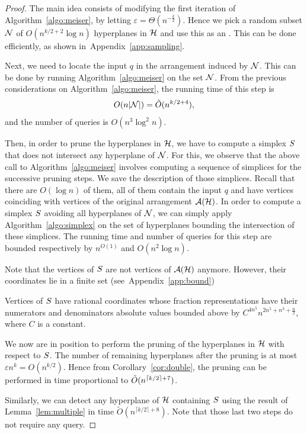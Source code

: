 \begin{proof}
The main idea consists of modifying the first iteration of Algorithm~\ref{algo:meiser}, by
letting $\varepsilon = \Theta(n^{-\frac{k}{2}})$.
Hence we pick a random subset $\mathcal{N}$ of
$O(n^{k/2 + 2} \log n)$ hyperplanes in $\mathcal{H}$ and use this as an \enet.
This can be done efficiently, as shown in~Appendix~\ref{app:sampling}.

Next, we need to locate the input $q$ in the arrangement induced by
$\mathcal{N}$. This can be done by running Algorithm~\ref{algo:meiser} on the set
$\mathcal{N}$. From the previous considerations on Algorithm~\ref{algo:meiser}, the
running time of this step is
$$
O(n|\mathcal{N}|) = \tilde{O}(n^{k/2 + 4}),
$$
and the number of queries is $O(n^3\log^2 n)$.

Then, in order to prune the hyperplanes in $\mathcal{H}$, we have to
compute a simplex $S$ that does not intersect any hyperplane of
$\mathcal{N}$. For this, we observe that the above call to Algorithm~\ref{algo:meiser}
involves computing a sequence of simplices for the successive pruning
steps. We save the description of those simplices. Recall that there are
$O(\log n)$ of them, all of them contain the input $q$ and have vertices
coinciding with vertices of the original arrangement $\mathcal{A}(\mathcal{H})$. In
order to compute a simplex $S$ avoiding all hyperplanes of
$\mathcal{N}$, we can simply apply Algorithm~\ref{algo:simplex} on the set of
hyperplanes bounding the intersection of these simplices. The running time
and number of queries for this step are bounded respectively by
$n^{O(1)}$ and $O(n^2\log n)$.

Note that the vertices of $S$ are not vertices
of $\mathcal{A}(\mathcal{H})$ anymore. However, their coordinates lie in a finite set
(see~Appendix~\ref{app:bound})
\begin{lemma}\label{lem:bound}
Vertices of $S$ have rational coordinates whose fraction representations
have their numerators and denominators absolute values bounded above by
$C^{4n^5} n^{2n^5+n^3+\frac n2}$, where $C$ is a constant.
\end{lemma}

We now are in position to perform the pruning of the hyperplanes in $\mathcal{H}$ with
respect to $S$. The number of remaining hyperplanes after the pruning is
at most $\varepsilon n^k = O(n^{k/2})$. Hence from Corollary~\ref{cor:double}, the
pruning can be performed in time proportional to $\tilde{O}(n^{\lceil k/2\rceil + 7})$.

Similarly, we can detect any hyperplane of $\mathcal{H}$ containing $S$ using the
result of Lemma~\ref{lem:multiple} in time $\tilde{O}(n^{\lceil k/2\rceil +
8})$. Note that those last two steps do not require any query.


\end{proof}
